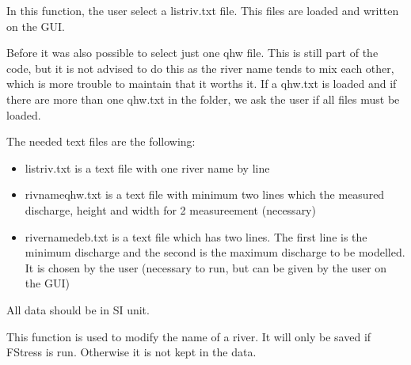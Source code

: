 \documentclass[letterpaper,10pt,english]{sphinxmanual}
\begin{document}
\begin{fulllineitems}
\begin{fulllineitems}
\end{fulllineitems}


\begin{fulllineitems}
\label{\detokenize{index:src_GUI.fstress_GUI.FstressW.load_txt}}
In this function, the user select  a listriv.txt file. This files are loaded and written on the GUI.

Before it was also possible to select just one qhw file. This is still part of the code, but it is not advised
to do this as the river name tends to mix each other, which is more trouble to maintain that it worths it.
If a qhw.txt is loaded and if there are more than one qhw.txt in the folder, we ask the user if all files must
be loaded.

The needed text files are the following:
\begin{itemize}
\item {} 
listriv.txt is a text file with one river name by line

\item {} 
rivnameqhw.txt is a text file with minimum two lines which the measured discharge, height and width for
2 measureement (necessary)

\item {} 
rivernamedeb.txt is a text file which has two lines. The first line is the minimum discharge and the second is
the maximum discharge to be modelled. It is chosen by the user (necessary to run, but can be given by the user
on the GUI)

\end{itemize}

All data should be in SI unit.

\end{fulllineitems}


\begin{fulllineitems}
\label{\detokenize{index:src_GUI.fstress_GUI.FstressW.modify_name}}
This function is used to modify the name of a river. It will only be saved if FStress is run. Otherwise it
is not kept in the data.

\end{fulllineitems}



\end{fulllineitems}
\end{document}
